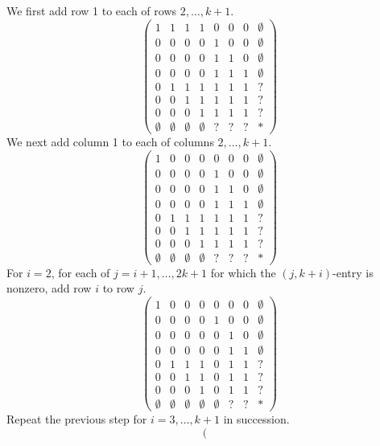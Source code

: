 \documentclass[amssymb,twocolumn,pra,10pt,aps]{revtex4-1}
\begin{document}
\begin{itemize}
We first add row 1 to each of rows $2, \dots, k+1$.
\[
\left(
\begin{array}{ccccccc|c}
1 & 1 & 1 & 1 & 0 & 0 & 0 & \emptyset \\
0 & 0 & 0 & 0 & 1 & 0 & 0 & \emptyset \\
0 & 0 & 0 & 0 & 1 & 1 & 0 & \emptyset \\
0 & 0 & 0 & 0 & 1 & 1 & 1 & \emptyset \\
0 & 1 & 1 & 1 & 1 & 1 & 1 & ? \\
0 & 0 & 1 & 1 & 1 & 1 & 1 & ? \\
0 & 0 & 0 & 1 & 1 & 1 & 1 & ? \\
\hline
\emptyset & \emptyset & \emptyset & \emptyset & ? & ? & ? & *
\end{array}
\right)
\]
We next add column 1 to each of columns $2, \dots, k+1$.
\[
\left(
\begin{array}{ccccccc|c}
1 & 0 & 0 & 0 & 0 & 0 & 0 & \emptyset \\
0 & 0 & 0 & 0 & 1 & 0 & 0 & \emptyset \\
0 & 0 & 0 & 0 & 1 & 1 & 0 & \emptyset \\
0 & 0 & 0 & 0 & 1 & 1 & 1 & \emptyset \\
0 & 1 & 1 & 1 & 1 & 1 & 1 & ? \\
0 & 0 & 1 & 1 & 1 & 1 & 1 & ? \\
0 & 0 & 0 & 1 & 1 & 1 & 1 & ? \\
\hline
\emptyset & \emptyset & \emptyset & \emptyset & ? & ? & ? & *
\end{array}
\right)
\]
For $i=2$, for each of $j=i+1,\dots,2k+1$
for which the $(j, k+i)$-entry is nonzero,
add row $i$ to row $j$.
\[
\left(
\begin{array}{ccccccc|c}
1 & 0 & 0 & 0 & 0 & 0 & 0 & \emptyset \\
0 & 0 & 0 & 0 & 1 & 0 & 0 & \emptyset \\
0 & 0 & 0 & 0 & 0 & 1 & 0 & \emptyset \\
0 & 0 & 0 & 0 & 0 & 1 & 1 & \emptyset \\
0 & 1 & 1 & 1 & 0 & 1 & 1 & ? \\
0 & 0 & 1 & 1 & 0 & 1 & 1 & ? \\
0 & 0 & 0 & 1 & 0 & 1 & 1 & ? \\
\hline
\emptyset & \emptyset & \emptyset & \emptyset & \emptyset & ? & ? & *
\end{array}
\right)
\]
Repeat the previous step for $i=3,\dots,k+1$ in succession.
\[
\left(
\begin{array}{ccccccc|c}

\end{array}\]
\end{itemize}
\end{document}
